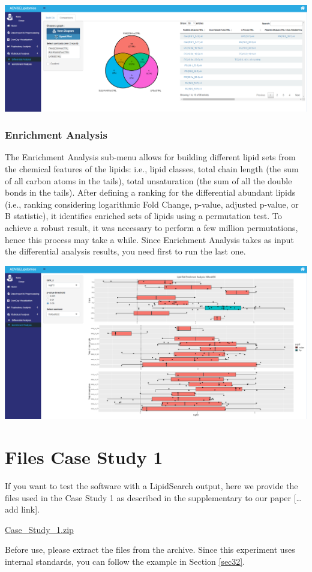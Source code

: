 \documentclass[
]{book}
\begin{document}
\includegraphics[width=1\linewidth]{images/venn}

\hypertarget{sec352}{%
\subsection{Enrichment Analysis}\label{sec352}}

The Enrichment Analysis sub-menu allows for building different lipid sets from the chemical features of the lipids: i.e., lipid classes, total chain length (the sum of all carbon atoms in the tails), total unsaturation (the sum of all the double bonds in the tails). After defining a ranking for the differential abundant lipids (i.e., ranking considering logarithmic Fold Change, p-value, adjusted p-value, or B statistic), it identifies enriched sets of lipids using a permutation test. To achieve a robust result, it was necessary to perform a few million permutations, hence this process may take a while. Since Enrichment Analysis takes as input the differential analysis results, you need first to run the last one.

\includegraphics[width=1\linewidth]{images/enrichment}

\hypertarget{filestudy}{%
\chapter{Files Case Study 1}\label{filestudy}}

If you want to test the software with a LipidSearch output, here we provide the files used in the Case Study 1 as described in the supplementary to our paper {[}\ldots add link{]}.

\href{https://github.com/ShinyFabio/ADViSELipidomics_book/raw/main/data_example/Case_Study_\%231.zip}{Case\_Study\_1.zip}

Before use, please extract the files from the archive. Since this experiment uses internal standards, you can follow the example in Section \ref{sec32}.

  
\end{document}
